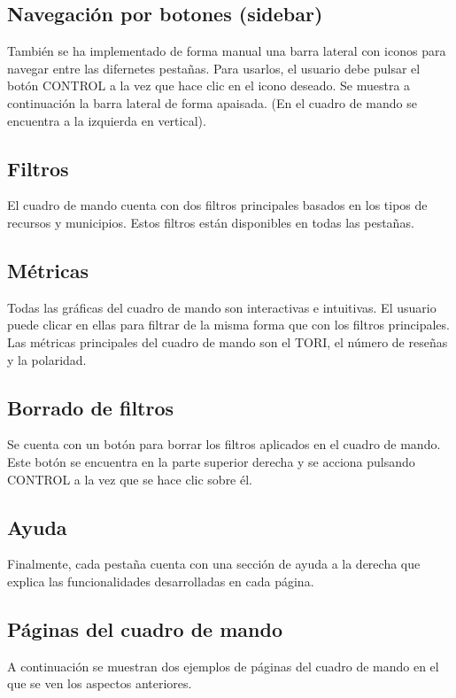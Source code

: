 
\subsection{Navegación por botones (sidebar)}

También se ha implementado de forma manual una barra lateral con iconos para navegar entre las difernetes pestañas. 
Para usarlos, el usuario debe pulsar el botón CONTROL a la vez que hace clic en el icono deseado.
Se muestra a continuación la barra lateral de forma apaisada. (En el cuadro de mando se encuentra a la izquierda en vertical).

\subsection{Filtros}

El cuadro de mando cuenta con dos filtros principales basados en los tipos de recursos y municipios. 
Estos filtros están disponibles en todas las pestañas.

\subsection{Métricas}

Todas las gráficas del cuadro de mando son interactivas e intuitivas.
El usuario puede clicar en ellas para filtrar de la misma forma que con los filtros principales.
Las métricas principales del cuadro de mando son el TORI, el número de reseñas y la polaridad.

\subsection{Borrado de filtros}

Se cuenta con un botón para borrar los filtros aplicados en el cuadro de mando.
Este botón se encuentra en la parte superior derecha y se acciona pulsando CONTROL a la vez que se hace clic sobre él.

\subsection{Ayuda}

Finalmente, cada pestaña cuenta con una sección de ayuda a la derecha que explica las funcionalidades desarrolladas en cada página.

\subsection{Páginas del cuadro de mando}
A continuación se muestran dos ejemplos de páginas del cuadro de mando en el que se ven los aspectos anteriores.
